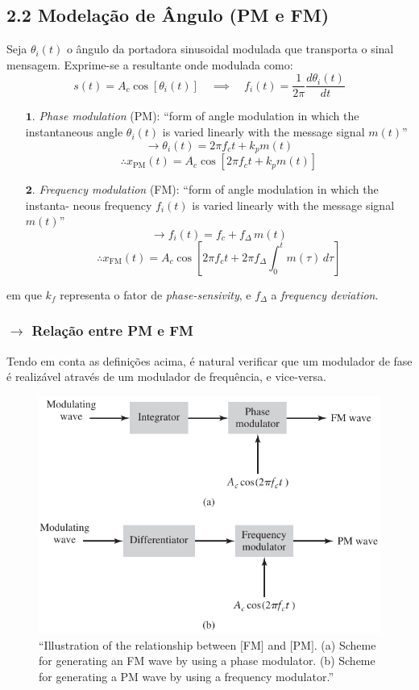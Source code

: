 \clearpage
\subsection{2.2 Modelação de Ângulo (PM e FM)}
\label{subsubsec:PM-FM}

Seja $\theta_i(t)$ o ângulo da portadora sinusoidal modulada que transporta o sinal mensagem. Exprime-se a resultante onde modulada como:
$$
    \boxed{ s(t) = A_c \cos\left[\theta_i(t)\right] }
    \quad \implies \quad
    f_i(t) = \frac{1}{2\pi} \frac{d \theta_i(t)}{dt}
$$

\begin{enumerate}
    \item[$\pmb{1.}$] \textit{Phase modulation} (PM): ``form of angle modulation in which the instantaneous angle $\theta_i(t)$ is varied linearly with the message signal $m(t)$''
    $$
        \pmb{\rightarrow} \theta_i(t) = 2\pi f_c t + k_p m(t)
    $$
    $$
        \therefore x_{\text{PM}}(t) = A_c \cos\left[ 2\pi f_c t + k_p m(t) \right]
    $$

    \item[$\pmb{2.}$] \textit{Frequency modulation} (FM): ``form of angle modulation in which the instanta- neous frequency $f_i(t)$ is varied linearly with the message signal $m(t)$''
    $$
        \pmb{\rightarrow} f_i(t) = f_c + f_\Delta\, m(t)
    $$
    $$
        \therefore x_{\text{FM}}(t) = A_c \cos\left[ 2\pi f_c t + 2\pi f_\Delta \int_{0}^{t} m(\tau) \, d\tau \right]
    $$
\end{enumerate}

\noindent em que $k_f$ representa o fator de \textit{phase-sensivity}, e $f_\Delta$ a \textit{frequency deviation}.
\subsubsection[2.2.1 Relação entre PM e FM]{$\rightarrow$ Relação entre PM e FM}
\label{subsubsec:PM-FM-relation}

Tendo em conta as definições acima, é natural verificar que um modulador de fase é realizável através de um modulador de frequência, e vice-versa.
\begin{figure}[H]
    \centering
    \includegraphics[width = 0.5\linewidth]{img/analog/FM/PM-FM-relation.png}
    \caption{``Illustration of the relationship between $[$FM$]$ and $[$PM$]$. (a) Scheme for generating an FM wave by using a phase modulator. (b) Scheme for generating a PM wave by using a frequency modulator.''\cite{Haykin2007}}
    \label{fig:PM-FM-relation}
\end{figure}

